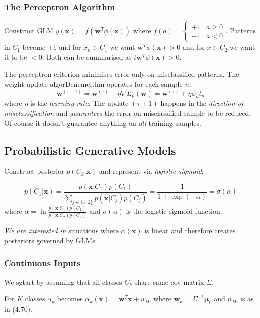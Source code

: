 \documentclass[a4paper]{article}
\newcommand{\mb}{\mathbf}
\begin{document}
\subsubsection{The Perceptron Algorithm}
Construct GLM $y(\mb{x})=f(\mb{w}^T\phi(\mb{x}))$ where $f(a) = \begin{cases}+1 & a\ge 0 \\ -1& a<0 \end{cases}$. Patterns in $C_1$ become +1 and for $x_n \in C_1$ we want $\mb{w}^T\phi(\mb{x})>0$ and for $x\in C_2$ we want it to be $<0$. Both can be summarised as $t\mb{w}^T\phi(\mb{x})>0$.

The perceptron criterion minimises error only on misclassified patterns. The weight update algorDenemeithm operates for each sample $n$:
%
\begin{equation}
\mb{w}^{(\tau+1)}=\mb{w}^{(\tau)}-\eta \nabla E_p(\mb{w}) = \mb{w}^(\tau)+\eta \phi_n t_n
\end{equation}
%
where $\eta$ is the \textit{learning rate}. The update $(\tau+1)$ happens in the \textit{direction of misclassification} and \textit{guarantees} the error on misclassified sample to be reduced. Of course it doesn't guarantee anything on \textit{all} training samples.

\subsection{Probabilistic Generative Models}
Construct posterior $p(C_k|\mb{x})$ and represent via \textit{logistic sigmoid}:

\begin{equation}
p(C_1|\mb{x}) = \frac{p(\mb{x}|C_1)p(C_1)}{\sum\limits_{j\in \{1,2\}} p(\mb{x}|C_j)p(C_j)}=\frac{1}{1+\exp(-\alpha)}=\sigma(\alpha)
\end{equation}
%
%
where $\alpha = \ln \frac{p(\mb{x}|C_1)p(C_1)}{p(\mb{x}|C_2)p(C_2)}$ and $\sigma(\alpha)$ is the logistic sigmoid function.

\textit{We are interested in} situations where $\alpha(\mb{x})$ is linear and therefore creates posteriors governed by GLMs.

\subsubsection{Continuous Inputs}
We sgtart by assuming that all classes $C_k$ share same cov matrix $\Sigma$.

For $K$ classes $\alpha_k$ becomes $\alpha_k(\mb{x}) = \mb{w}^T\mb{x}+w_{k0}$ where $\mb{w}_k=\Sigma^{-1}\boldsymbol{\mu}_k$ and $w_{k0}$ is as in (4.70). 
\end{document}
